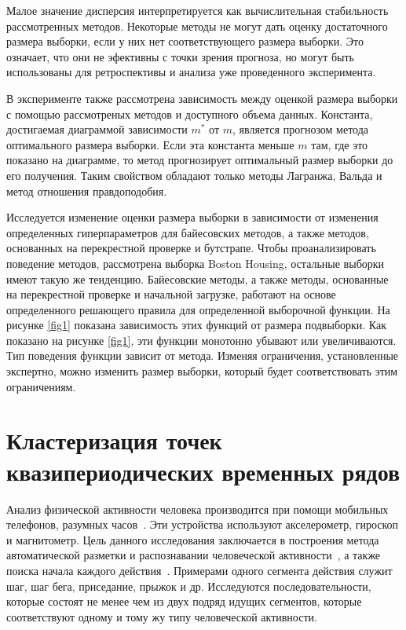 Малое значение дисперсия интерпретируется как вычислительная стабильность рассмотренных методов. Некоторые методы не могут дать оценку достаточного размера выборки, если у них нет соответствующего размера выборки. Это означает, что они не эфективны с точки зрения прогноза, но могут быть использованы для ретроспективы и анализа уже проведенного эксперимента.

В эксперименте также рассмотрена зависимость между оценкой размера выборки с помощью рассмотреных методов и доступного объема данных. Константа, достигаемая диаграммой зависимости $m^*$ от $m$, является прогнозом метода оптимального размера выборки. Если эта константа меньше $m$ там, где это показано на диаграмме, то метод прогнозирует оптимальный размер выборки до его получения. Таким свойством обладают только методы Лагранжа, Вальда и метод отношения правдоподобия.

Исследуется изменение оценки размера выборки в зависимости от изменения определенных гиперпараметров для байесовских методов, а также методов, основанных на перекрестной проверке и бутстрапе. Чтобы проанализировать поведение методов, рассмотрена выборка {Boston Housing}, остальные выборки имеют такую же тенденцию.
Байесовские методы, а также методы, основанные на перекрестной проверке и начальной загрузке, работают на основе определенного решающего правила для определенной выборочной функции. На рисунке \ref{fig1} показана зависимость этих функций от размера подвыборки. Как показано на рисунке \ref{fig1}, эти функции монотонно убывают или увеличиваются. Тип поведения функции зависит от метода. Изменяя ограничения, установленные экспертно, можно изменить размер выборки, который будет соответствовать этим ограничениям.


\section{Кластеризация точек квазипериодических временных рядов}

Анализ физической активности человека производится при помощи мобильных телефонов, разумных часов~\cite{kwapisz2010, wang2014}. 
Эти устройства используют акселерометр, гироскоп и магнитометр. 
Цель данного исследования заключается в построения метода автоматической разметки и распознавании человеческой активности~\cite{Ignatov2015, Olivares2012, cinar2018}, а также поиска начала каждого действия~\cite{motrenko2015}. 
Примерами одного сегмента действия служит шаг, шаг бега, приседание, прыжок и др. 
Исследуются последовательности, которые состоят не менее чем из двух подряд идущих сегментов, которые соответствуют одному и тому жу типу человеческой активности.

